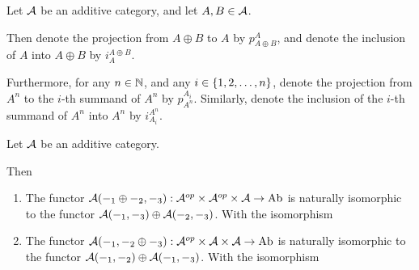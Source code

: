 \begin{notation}
    Let \( {\mathcal{A}} \) be an additive category, and let \( A, B \in {\mathcal{A}} \).

    Then denote the projection from \( A \oplus B \) to \( A \) by \( p_{A \oplus B}^A \), and denote the inclusion of \( A \) into \( A \oplus B \) by \( i_A^{A \oplus B} \).

    Furthermore, for any \( n \in {\mathbb{N}} \), and any \( i \in \left\{ 1, 2, \dots, n \right\} \), denote the projection from \( A^n \) to the \( i \)-th summand of \( A^n \) by \( p_{A^n}^{A_i} \). Similarly, denote the inclusion of the \( i \)-th summand of \( A^n \) into \( A^n \) by \( i_{A_i}^{A^n} \).
\end{notation}

\begin{lemma} \label{lem:hom_natural_iso}
    Let \( {\mathcal{A}} \) be an additive category.
    
    Then 
    \begin{enumerate}
        \item {
            The functor \( {\mathcal{A}}(-_1 \oplus -_2, -_3): {\mathcal{A}}^{op} \times {\mathcal{A}}^{op} \times {\mathcal{A}} \to \operatorname{Ab} \) is naturally isomorphic to the functor \( {\mathcal{A}}(-_1, -_3) \oplus {\mathcal{A}}(-_2, -_3) \). With the isomorphism

            \begin{center}
            \end{center}
        }
        \item {
            The functor \( {\mathcal{A}}(-_1, -_2 \oplus -_3): {\mathcal{A}}^{op} \times {\mathcal{A}} \times {\mathcal{A}} \to \operatorname{Ab} \) is naturally isomorphic to the functor \( {\mathcal{A}}(-_1, -_2) \oplus {\mathcal{A}}(-_1, -_3) \). With the isomorphism

}
\end{enumerate}
\end{lemma}
